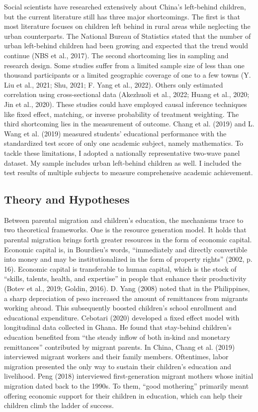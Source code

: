 \documentclass[
  man,floatsintext]{apa7}
\begin{document}
Social scientists have researched extensively about China's left-behind children, but the current literature still has three major shortcomings. The first is that most literature focuses on children left behind in rural areas while neglecting the urban counterparts. The National Bureau of Statistics stated that the number of urban left-behind children had been growing and expected that the trend would continue (NBS et al., 2017). The second shortcoming lies in sampling and research design. Some studies suffer from a limited sample size of less than one thousand participants or a limited geographic coverage of one to a few towns (Y. Liu et al., 2021; Shu, 2021; F. Yang et al., 2022). Others only estimated correlation using cross-sectional data (Akezhuoli et al., 2022; Huang et al., 2020; Jin et al., 2020). These studies could have employed causal inference techniques like fixed effect, matching, or inverse probability of treatment weighting. The third shortcoming lies in the measurement of outcome. Chang et al. (2019) and L. Wang et al. (2019) measured students' educational performance with the standardized test score of only one academic subject, namely mathematics. To tackle these limitations, I adopted a nationally representative two-wave panel dataset. My sample includes urban left-behind children as well. I included the test results of multiple subjects to measure comprehensive academic achievement.

\hypertarget{theory-and-hypotheses}{%
\subsection{Theory and Hypotheses}\label{theory-and-hypotheses}}

Between parental migration and children's education, the mechanisms trace to two theoretical frameworks. One is the resource generation model. It holds that parental migration brings forth greater resources in the form of economic capital. Economic capital is, in Bourdieu's words, ``immediately and directly convertible into money and may be institutionalized in the form of property rights'' (2002, p. 16). Economic capital is transferable to human capital, which is the stock of ``skills, talents, health, and expertise'' in people that enhance their productivity (Botev et al., 2019; Goldin, 2016). D. Yang (2008) noted that in the Philippines, a sharp depreciation of peso increased the amount of remittances from migrants working abroad. This subsequently boosted children's school enrollment and educational expenditure. Cebotari (2020) developed a fixed effect model with longitudinal data collected in Ghana. He found that stay-behind children's education benefited from ``the steady inflow of both in-kind and monetary remittances'' contributed by migrant parents. In China, Chang et al. (2019) interviewed migrant workers and their family members. Oftentimes, labor migration presented the only way to sustain their children's education and livelihood. Peng (2018) interviewed first-generation migrant mothers whose initial migration dated back to the 1990s. To them, ``good mothering'' primarily meant offering economic support for their children in education, which can help their children climb the ladder of success.
\end{document}
